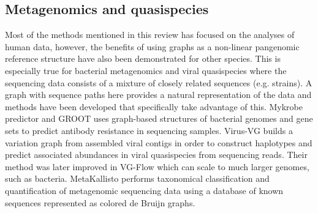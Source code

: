 %

\subsection{Metagenomics and quasispecies}
Most of the methods mentioned in this review has focused on the analyses of human data, however, the benefits of using graphs as a non-linear pangenomic reference structure have also been demonstrated for other species.
This is especially true for bacterial metagenomics and viral quasispecies where the sequencing data consists of a mixture of closely related sequences (e.g. strains).
A graph with sequence paths here provides a natural representation of the data and methods have been developed that specifically take advantage of this. 
Mykrobe predictor \cite{Bradley2015-kl} and GROOT \cite{Rowe2018-bg} uses graph-based structures of bacterial genomes and gene sets to predict antibody resistance in sequencing samples.
Virus-VG \cite{Baaijens2019-ng} builds a variation graph from assembled viral contigs in order to construct haplotypes and predict associated abundances in viral quasispecies from sequencing reads.
Their method was later improved in VG-Flow \cite{Baaijens2019-ha} which can scale to much larger genomes, such as bacteria.  
MetaKallisto \cite{Schaeffer2017-fh} performs taxonomical classification and quantification of metagenomic sequencing data using a database of known sequences represented as colored de Bruijn graphs.


